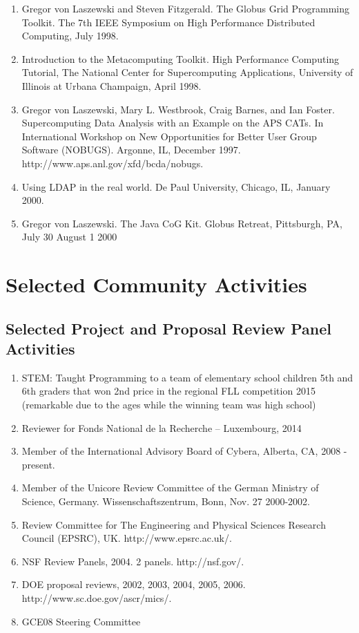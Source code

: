 \documentclass{article}
\begin{document}
\begin{enumerate}
\item  Gregor von Laszewski and Steven Fitzgerald. The Globus Grid Programming Toolkit. The 7th IEEE Symposium on High Performance Distributed Computing, July 1998. 
\item  Introduction to the Metacomputing Toolkit. High Performance Computing Tutorial, The National Center for Supercomputing Applications, University of Illinois at Urbana Champaign, April 1998. 
\item  Gregor von Laszewski, Mary L. Westbrook, Craig Barnes, and Ian Foster. Supercomputing Data Analysis with an Example on the APS CATs. In International Workshop on New Opportunities for Better User Group Software (NOBUGS). Argonne, IL, December 1997. http://www.aps.anl.gov/xfd/bcda/nobugs. 
\item  Using LDAP in the real world. De Paul University, Chicago, IL, January 2000. 
\item  Gregor von Laszewski. The Java CoG Kit. Globus Retreat, Pittsburgh, PA, July 30 August 1 2000 
\end{enumerate}
 
\section{Selected Community Activities}

\subsection{Selected Project and Proposal Review Panel Activities} 

\begin{enumerate}
\item  STEM: Taught Programming to a team of elementary school children 5th and 6th graders that won 2nd price in the regional FLL competition 2015 (remarkable due to the ages while the winning team was high school) 
\item  Reviewer for Fonds National de la Recherche – Luxembourg, 2014 
\item  Member of the International Advisory Board of Cybera, Alberta, CA, 2008 - present.
\item  Member of the Unicore Review Committee of the German Ministry of Science, Germany. Wissenschaftszentrum, Bonn, Nov. 27 2000-2002. 
\item  Review Committee for The Engineering and Physical Sciences Research Council (EPSRC), UK. http://www.epsrc.ac.uk/. 
\item  NSF Review Panels, 2004. 2 panels. http://nsf.gov/. 
\item  DOE proposal reviews, 2002, 2003, 2004, 2005, 2006. http://www.sc.doe.gov/ascr/mics/. 
\item  GCE08 Steering Committee
\end{enumerate}
 
\end{document}

